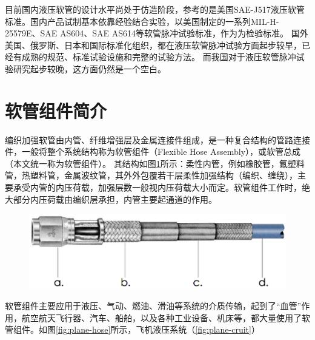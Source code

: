 目前国内液压软管的设计水平尚处于仿造阶段，参考的是美国SAE-J517液压软管标准。国内产品试制基本依靠经验结合实验，以美国制定的一系列MIL-H-25579E、SAE AS604、SAE AS614等软管脉冲试验标准，作为为检验标准。
国外美国、俄罗斯、日本和国际标准化组织，都在液压软管脉冲试验方面起步较早，已经有成熟的规范、标准试验设施和完整的试验方法。
而我国对于液压软管脉冲试验研究起步较晚，这方面仍然是一个空白。













\section{软管组件简介}
编织加强软管由内管、纤维增强层及金属连接件组成，是一种复合结构的管路连接件，一般将整个系统结构称为软管组件（Flexible Hose Assembly），或软管总成（本文统一称为软管组件）。
其结构如图\ref{fig:hose structure}所示：柔性内管，例如橡胶管，氟塑料管，热塑料管，金属波纹管，其外外包覆若干层柔性加强结构（编织、缠绕），主要承受内管的内压荷载，加强层数一般视内压荷载大小而定。软管组件工作时，绝大部分内压荷载由编织层承担，内管主要起通道的作用。


\begin{figure}[!htbp]
\centering
\includegraphics[width=0.6\linewidth]{figure/chap1/Hose-Structure}
\label{fig:hose structure}
\end{figure}


软管组件主要应用于液压、气动、燃油、滑油等系统的介质传输，起到了“血管”作用，航空航天飞行器、汽车、船舶，以及各种工业设备、机床等，都大量使用了软管组件。如图\ref{fig:plane-hose}所示，飞机液压系统（\ref{fig:plane-cruit}）




